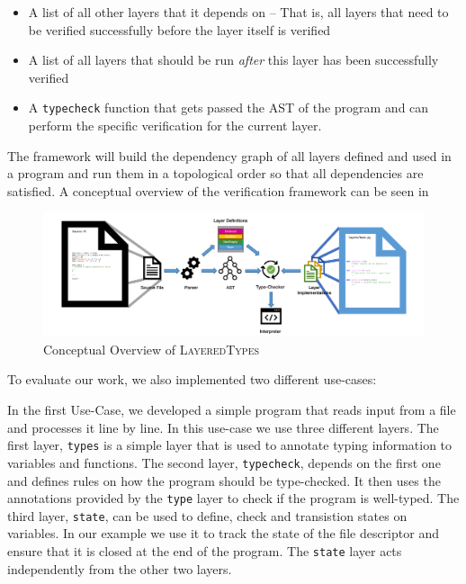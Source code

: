 \documentclass{easychair}
\newcommand{\LayeredTypes}{\textsc{LayeredTypes}}
\begin{document}
\begin{itemize}
	\item A list of all other layers that it depends on -- That is, all layers that need to be verified successfully before the layer itself is verified
	\item A list of all layers that should be run \textit{after} this layer has been successfully verified
	\item A \texttt{typecheck} function that gets passed the AST of the program and can perform the specific verification for the current layer.
\end{itemize}

The framework will build the dependency graph of all layers defined and used in a program and run them in a topological order so that all dependencies are satisfied. A conceptual overview of the verification framework can be seen in 

\begin{figure}[ht!]
	\centering
	\includegraphics[width=.8\textwidth]{framework_overview}
	\caption{Conceptual Overview of \LayeredTypes}
	\label{fig:framework_overview}
\end{figure}

To evaluate our work, we also implemented two different use-cases:

In the first Use-Case, we developed a simple program that reads input from a file and processes it line by line. In this use-case we use three different layers. The first layer, \texttt{types} is a simple layer that is used to annotate typing information to variables and functions. The second layer, \texttt{typecheck}, depends on the first one and defines rules on how the program should be type-checked. It then uses the annotations provided by the \texttt{type} layer to check if the program is well-typed. The third layer, \texttt{state}, can be used to define, check and transistion states on variables. In our example we use it to track the state of the file descriptor and ensure that it is closed at the end of the program. The \texttt{state} layer acts independently from the other two layers.
\end{document}
